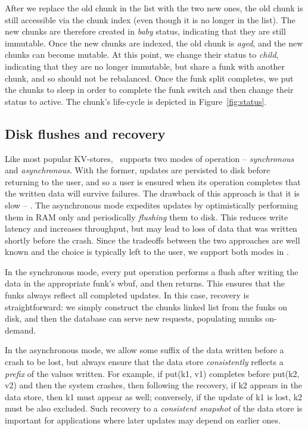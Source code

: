 After we replace the old chunk in the list with the two new ones, 
the old chunk is still accessible via the chunk index (even though it is no longer in the list). 
The new chunks are therefore created in \emph{baby} status, indicating that they are still immutable. 
Once the new chunks are indexed, the old chunk is \emph{aged}, and the new chunks can become mutable.
At this point, we change their status to \emph{child}, indicating that they are no longer immutable, but share a funk with another chunk,
and so should not be rebalanced. Once the funk split completes, we put the chunks to sleep in order
to complete the funk switch and then change their  status  to active. 
The chunk's life-cycle is depicted in Figure~\ref{fig:status}.

\subsection{Disk flushes and recovery}
\label{ssec:flush-recovery}

Like most popular KV-stores, \sys\ supports two modes of operation -- \emph{synchronous} and \emph{asynchronous}. 
With the former,  updates are persisted to disk before returning to the user, and so a user is ensured when its operation
completes that the written data will survive failures. The drawback of this approach is that it is slow -- . 
The asynchronous mode expedites updates by optimistically performing them in
RAM only and periodically \emph{flushing} them to disk. This reduces write latency and increases throughput, but 
may lead to loss of data that was written shortly before the crash. Since the tradeoffs between the two approaches are 
well known and the choice is typically left to the user, we support both modes in \sys.

In the synchronous mode, every put operation performs a flush after writing the data in the appropriate funk's wbuf, and then returns. 
This ensures that the funks always reflect all completed updates. In this case, recovery is straightforward: we simply construct
the chunks linked list from the funks on disk, and then the database can serve new requests, populating munks on-demand.  

In the asynchronous mode, we allow some suffix of the  data written before a crash to be lost, but always 
ensure that the data store \emph{consistently} reflects a \emph{prefix} of the  values written.
For example, if put(k1, v1) completes before put(k2, v2) and then the system crashes, then following the recovery, 
if k2 appears in the data store, then k1 must appear as well; conversely, if the update of k1 is lost, k2 must be also excluded.
Such recovery to a \emph{consistent snapshot} of the data store is important for applications where later updates may depend on earlier ones. 










